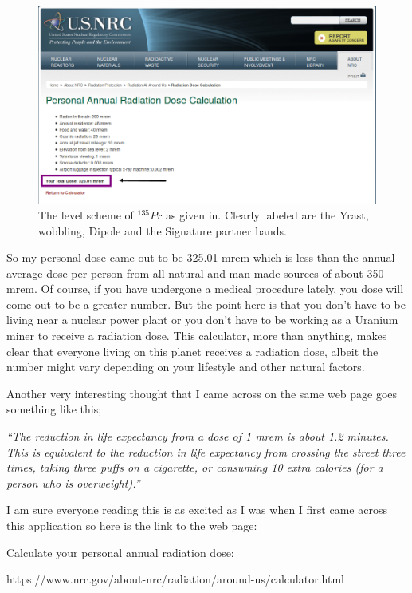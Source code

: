 \documentclass[%
 amsmath,amssymb,
]{article}
\begin{document}
\begin{figure}
\begin{center}
\includegraphics[width = \textwidth]{my_dose}
\caption{The level scheme of $^{135}Pr$ as given in. Clearly labeled are the Yrast, wobbling, Dipole and the Signature partner bands.}
\end{center}
\end{figure}

So my personal dose came out to be 325.01 mrem which is less than the annual average dose per person from all natural and man-made sources of about 350 mrem. Of course, if you have undergone a medical procedure lately, you dose will come out to be a greater number. But the point here is that you don’t have to be living near a nuclear power plant or you don’t have to be working as a Uranium miner  to receive a radiation dose. This calculator, more than anything, makes clear that everyone living on this planet receives a radiation dose, albeit the number might vary depending on your lifestyle and other natural factors.

Another very interesting thought that I came across on the same web page goes something like this;

\textit{“The reduction in life expectancy from a dose of 1 mrem is about 1.2 minutes. This is equivalent to the reduction in life expectancy from crossing the street three times, taking three puffs on a cigarette, or consuming 10 extra calories (for a person who is overweight).”}
 
I am sure everyone reading this is as excited as I was when I first came across this application so here is the link to the web page: 

Calculate your personal annual radiation dose: 

https://www.nrc.gov/about-nrc/radiation/around-us/calculator.html
\end{document}
